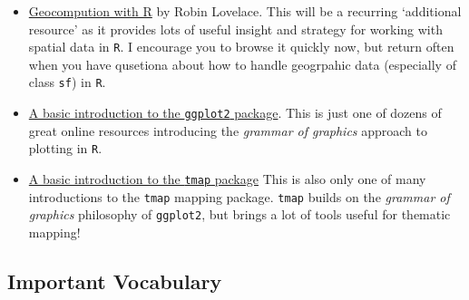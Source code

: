 \documentclass[
]{book}
\newcommand{\passthrough}[1]{#1}
\providecommand{\tightlist}{%
  \setlength{\itemsep}{0pt}\setlength{\parskip}{0pt}}
\begin{document}
\begin{itemize}
\tightlist
\item
  \href{https://geocompr.robinlovelace.net/}{Geocompution with R} by Robin Lovelace. This will be a recurring `additional resource' as it provides lots of useful insight and strategy for working with spatial data in \passthrough{\lstinline!R!}. I encourage you to browse it quickly now, but return often when you have qusetiona about how to handle geogrpahic data (especially of class \passthrough{\lstinline!sf!}) in \passthrough{\lstinline!R!}.
\item
  \href{https://bookdown.org/agrogankaylor/quick-intro-to-ggplot2/quick-intro-to-ggplot2.html}{A basic introduction to the \passthrough{\lstinline!ggplot2!} package}. This is just one of dozens of great online resources introducing the \emph{grammar of graphics} approach to plotting in \passthrough{\lstinline!R!}.
\item
  \href{https://tlorusso.github.io/geodata_workshop/tmap_package\#:~:text=The\%20tmap\%20package\%20is\%20a,as\%20choropleths\%20and\%20bubble\%20maps.}{A basic introduction to the \passthrough{\lstinline!tmap!} package} This is also only one of many introductions to the \passthrough{\lstinline!tmap!} mapping package. \passthrough{\lstinline!tmap!} builds on the \emph{grammar of graphics} philosophy of \passthrough{\lstinline!ggplot2!}, but brings a lot of tools useful for thematic mapping!
\end{itemize}

\hypertarget{important-vocabulary}{%
\subsection{Important Vocabulary}\label{important-vocabulary}}

 
  \providecommand{\huxb}[2]{\arrayrulecolor[RGB]{#1}\global\arrayrulewidth=#2pt}
  \providecommand{\huxvb}[2]{\color[RGB]{#1}\vrule width #2pt}
  \providecommand{\huxtpad}[1]{\rule{0pt}{#1}}
  \providecommand{\huxbpad}[1]{\rule[-#1]{0pt}{#1}}
\end{document}
